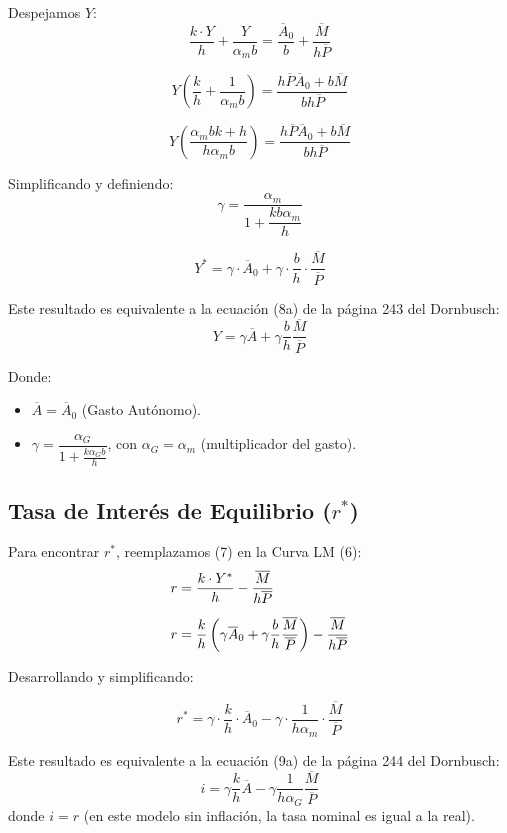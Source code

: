 \documentclass[11pt,a4paper]{article}
\newcommand{\barvar}[1]{\overline{#1}}
\begin{document}
Despejamos $Y$:
\[
\frac{k \cdot Y}{h} + \frac{Y}{\alpha_m b} = \frac{\barvar{A}_0}{b} + \frac{\barvar{M}}{h\barvar{P}}
\]

\[
Y\left(\frac{k}{h} + \frac{1}{\alpha_m b}\right) = \frac{h\barvar{P}\barvar{A}_0 + b\barvar{M}}{bh\barvar{P}}
\]

\[
Y\left(\frac{\alpha_m b k + h}{h \alpha_m b}\right) = \frac{h\barvar{P}\barvar{A}_0 + b\barvar{M}}{bh\barvar{P}}
\]

Simplificando y definiendo:
\[
\gamma = \frac{\alpha_m}{1 + \dfrac{kb\alpha_m}{h}}
\]

\begin{resultadobox}
\begin{equation}
    Y^* = \gamma \cdot \barvar{A}_0 + \gamma \cdot \frac{b}{h} \cdot \frac{\barvar{M}}{\barvar{P}} \tag{7}
\end{equation}
\end{resultadobox}

Este resultado es equivalente a la ecuación (8a) de la página 243 del Dornbusch:
\[
Y = \gamma \barvar{A} + \gamma \frac{b}{h}\frac{\barvar{M}}{\barvar{P}}
\]

Donde:
\begin{itemize}
    \item $\barvar{A} = \barvar{A}_0$ (Gasto Autónomo).
    \item $\gamma = \dfrac{\alpha_G}{1 + \frac{k \alpha_G b}{h}}$, con $\alpha_G = \alpha_m$ (multiplicador del gasto).
\end{itemize}

\subsection{Tasa de Interés de Equilibrio ($r^*$)}

Para encontrar $r^*$, reemplazamos (7) en la Curva LM (6):
\begin{align}
    r &= \frac{k \cdot Y^*}{h} - \frac{\barvar{M}}{h\barvar{P}} \notag \\[6pt]
    r &= \frac{k}{h}\left(\gamma \barvar{A}_0 + \gamma \frac{b}{h}\frac{\barvar{M}}{\barvar{P}}\right) - \frac{\barvar{M}}{h\barvar{P}} \notag
\end{align}

Desarrollando y simplificando:

\begin{resultadobox}
\begin{equation}
    r^* = \gamma \cdot \frac{k}{h} \cdot \barvar{A}_0 - \gamma \cdot \frac{1}{h \alpha_m} \cdot \frac{\barvar{M}}{\barvar{P}} \tag{8}
\end{equation}
\end{resultadobox}

Este resultado es equivalente a la ecuación (9a) de la página 244 del Dornbusch:
\[
i = \gamma \frac{k}{h}\barvar{A} - \gamma \frac{1}{h\alpha_G}\frac{\barvar{M}}{\barvar{P}}
\]
donde $i = r$ (en este modelo sin inflación, la tasa nominal es igual a la real).
\end{document}
